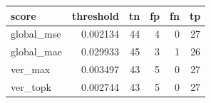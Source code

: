 \begin{tabular}{lrrrrr}
\toprule
score & threshold & tn & fp & fn & tp \\
\midrule
global_mse & 0.002134 & 44 & 4 & 0 & 27 \\
global_mae & 0.029933 & 45 & 3 & 1 & 26 \\
ver_max & 0.003497 & 43 & 5 & 0 & 27 \\
ver_topk & 0.002744 & 43 & 5 & 0 & 27 \\
\bottomrule
\end{tabular}
